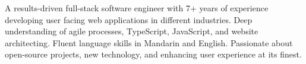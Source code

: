 

\begin{cvparagraph}

  A results-driven full-stack software engineer with 7+ years of experience developing user facing web applications in different industries.
  Deep understanding of agile processes, TypeScript, JavaScript, and website architecting. Fluent language skills in Mandarin and English.
  Passionate about open-source projects, new technology, and enhancing user experience at its finest.

\end{cvparagraph}
